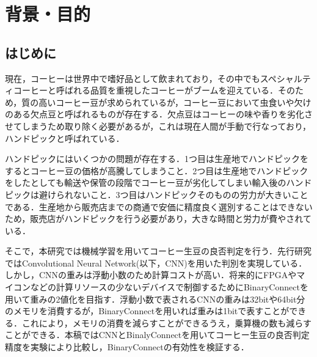 

\chapter{背景・目的}

\setcounter{page}{1}


\section{はじめに}
現在，コーヒーは世界中で嗜好品として飲まれており，その中でもスペシャルティコーヒーと呼ばれる品質を重視したコーヒーがブームを迎えている．そのため，質の高いコーヒー豆が求められているが，コーヒー豆において虫食いや欠けのある欠点豆と呼ばれるものが存在する．欠点豆はコーヒーの味や香りを劣化させてしまうため取り除く必要があるが，これは現在人間が手動で行なっており，ハンドピックと呼ばれている．

ハンドピックにはいくつかの問題が存在する．1つ目は生産地でハンドピックをするとコーヒー豆の価格が高騰してしまうこと．2つ目は生産地でハンドピックをしたとしても輸送や保管の段階でコーヒー豆が劣化してしまい輸入後のハンドピックは避けられないこと．3つ目はハンドピックそのものの労力が大きいことである．生産地から販売店までの商通で安価に精度良く選別することはできないため，販売店がハンドピックを行う必要があり，大きな時間と労力が費やされている．

そこで，本研究では機械学習を用いてコーヒー生豆の良否判定を行う．先行研究ではConvolutional Neural Network(以下，CNN)を用いた判別を実現している．しかし，CNNの重みは浮動小数のため計算コストが高い．将来的にFPGAやマイコンなどの計算リソースの少ないデバイスで制御するためにBinaryConnectを用いて重みの2値化を目指す．浮動小数で表されるCNNの重みは32bitや64bit分のメモリを消費するが，BinaryConnectを用いれば重みは1bitで表すことができる．これにより，メモリの消費を減らすことができるうえ，乗算機の数も減らすことができる\cite{binaryconnect}．本稿ではCNNとBinalyConnectを用いてコーヒー生豆の良否判定精度を実験により比較し，BinaryConnectの有効性を検証する．
